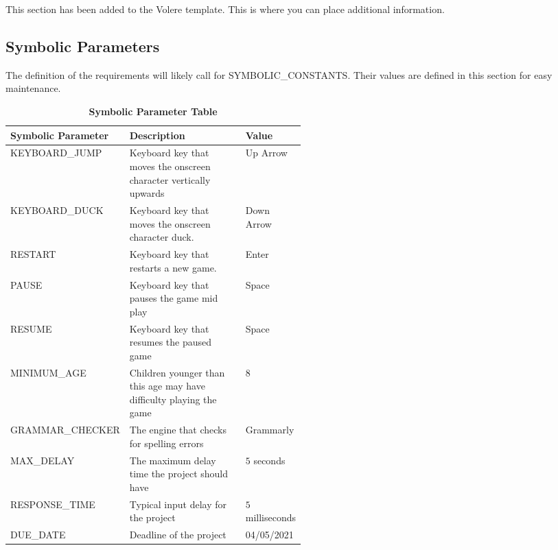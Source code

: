 \documentclass[12pt, titlepage]{article}
\begin{document}
This section has been added to the Volere template.  This is where you can place
additional information.

\subsection{Symbolic Parameters}

The definition of the requirements will likely call for SYMBOLIC\_CONSTANTS.
Their values are defined in this section for easy maintenance.
\begin{table}[h]
\caption{\bf Symbolic Parameter Table}
\begin{tabular}{|l|p{0.5\linewidth}|l|}
\hline
\multicolumn{1}{|l}{\bfseries Symbolic Parameter} & \multicolumn{1}{|l|}{\bfseries Description} & \multicolumn{1}{l|}{\bfseries Value}\\
\hline
KEYBOARD\_JUMP & Keyboard key that moves the onscreen character vertically upwards & Up Arrow \\
\hline
KEYBOARD\_DUCK & Keyboard key that moves the onscreen character duck. & Down Arrow \\
\hline
RESTART & Keyboard key that restarts a new game. & Enter\\
\hline
PAUSE & Keyboard key that pauses the game mid play & Space\\
\hline
RESUME & Keyboard key that resumes the paused game & Space\\
\hline
MINIMUM\_AGE & Children younger than this age may have difficulty playing the game & 8\\
\hline
GRAMMAR\_CHECKER & The engine that checks for spelling errors & Grammarly\\
\hline
MAX\_DELAY & The maximum delay time the project should have & $5$ seconds\\
\hline
RESPONSE\_TIME & Typical input delay for the project & $5$ milliseconds\\
\hline
DUE\_DATE & Deadline of the project & 04/05/2021\\
\hline
\end{tabular}
\end{table}
\end{document}
